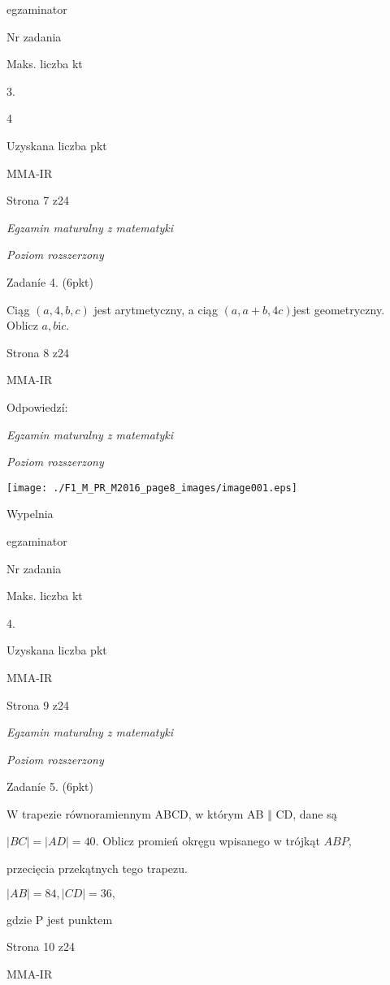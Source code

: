 \documentclass[a4paper,12pt]{article}
\begin{document}
egzaminator

Nr zadania

Maks. liczba kt

3.

4

Uzyskana liczba pkt

MMA-IR

Strona 7 z24





{\it Egzamin maturalny z matematyki}

{\it Poziom rozszerzony}

Zadaníe 4. (6pkt)

Ciąg $(a,4,b,c)$ jest arytmetyczny, a ciąg $(a,a+b,4c)$jest geometryczny. Oblicz $a, b\mathrm{i}c.$

Strona 8 z24

MMA-IR





Odpowiedzí:

{\it Egzamin maturalny z matematyki}

{\it Poziom rozszerzony}
\begin{center}
\texttt{[image: ./F1\_M\_PR\_M2016\_page8\_images/image001.eps]}
\end{center}
Wypelnia

egzaminator

Nr zadania

Maks. liczba kt

4.

Uzyskana liczba pkt

MMA-IR

Strona 9 z24





{\it Egzamin maturalny z matematyki}

{\it Poziom rozszerzony}

Zadaníe 5. (6pkt)

$\mathrm{W}$ trapezie równoramiennym ABCD, w którym AB $\Vert$ CD, dane są

$|BC|=|AD|=40$. Oblicz promień okręgu wpisanego w trójkąt $ABP,$

przecięcia przekątnych tego trapezu.

$|AB|=84, |CD|=36,$

gdzie P jest punktem

Strona 10 z24

MMA-IR
\end{document}
